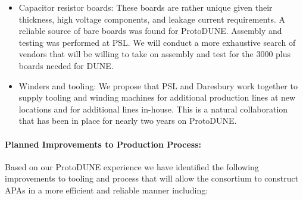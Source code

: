 \begin{itemize}
\item Capacitor resistor boards: These boards are rather unique given their thickness, high voltage components, and leakage current requirements. A reliable source of bare boards was found for ProtoDUNE. Assembly and testing was performed at PSL. We will conduct a more exhaustive search of vendors that will be willing to take on assembly and test for the 3000 plus boards needed for DUNE.
\item Winders and tooling: We propose that PSL and Daresbury work together to supply tooling and winding machines for additional production lines at new locations and for additional lines in-house. This is a natural collaboration that has been in place for nearly two years on ProtoDUNE.
\end{itemize}

\paragraph{Planned Improvements to Production Process:} Based on our ProtoDUNE experience we have identified the following improvements to tooling and process that will allow the consortium to construct APAs in a more efficient and reliable manner including:
